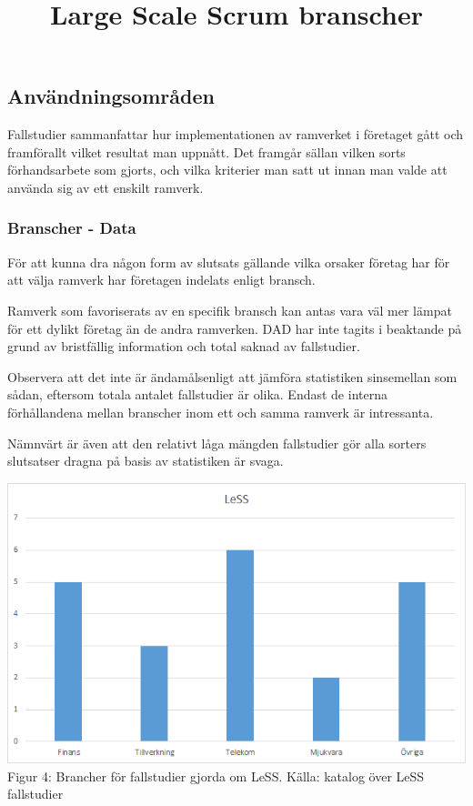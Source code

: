 		
	
	
	\subsection{Användningsområden}

		Fallstudier sammanfattar hur implementationen av ramverket i företaget gått och framförallt vilket resultat man uppnått. Det framgår sällan vilken sorts förhandsarbete som gjorts, och vilka kriterier man satt ut innan man valde att använda sig av ett enskilt ramverk.
		
		\subsubsection{Branscher - Data}
			
			För att kunna dra någon form av slutsats gällande vilka orsaker företag har för att välja ramverk har företagen indelats enligt bransch.
					
			Ramverk som favoriserats av en specifik bransch kan antas vara väl mer lämpat för ett dylikt företag än de andra ramverken. DAD har inte tagits i beaktande på grund av bristfällig information och total saknad av fallstudier.
			
			Observera att det inte är ändamålsenligt att jämföra statistiken sinsemellan som sådan, eftersom totala antalet fallstudier är olika. Endast de interna förhållandena mellan branscher inom ett och samma ramverk är intressanta.
				
			Nämnvärt är även att den relativt låga mängden fallstudier gör alla sorters slutsatser dragna på basis av statistiken är svaga.
			
			\title{Large Scale Scrum branscher}
			\begin{center}
				\includegraphics{Grafer/LeSS_brancher.png}
				\\ Figur 4: Brancher för fallstudier gjorda om LeSS. Källa: katalog över LeSS fallstudier \cite{less_casestudies} 
			\end{center}
		
